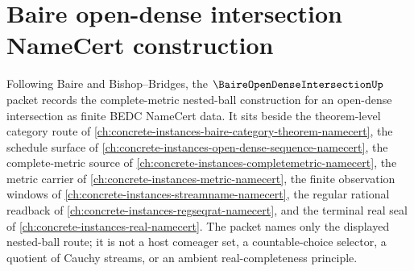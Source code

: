 \chapter{Baire open-dense intersection NameCert construction}
\label{ch:concrete-instances-baire-open-dense-intersection-namecert}

Following Baire and Bishop--Bridges, the $\BaireOpenDenseIntersectionUp$ packet records the complete-metric nested-ball construction for an open-dense intersection as finite BEDC NameCert data. It sits beside the theorem-level category route of \autoref{ch:concrete-instances-baire-category-theorem-namecert}, the schedule surface of \autoref{ch:concrete-instances-open-dense-sequence-namecert}, the complete-metric source of \autoref{ch:concrete-instances-completemetric-namecert}, the metric carrier of \autoref{ch:concrete-instances-metric-namecert}, the finite observation windows of \autoref{ch:concrete-instances-streamname-namecert}, the regular rational readback of \autoref{ch:concrete-instances-regseqrat-namecert}, and the terminal real seal of \autoref{ch:concrete-instances-real-namecert}. The packet names only the displayed nested-ball route; it is not a host comeager set, a countable-choice selector, a quotient of Cauchy streams, or an ambient real-completeness principle.

